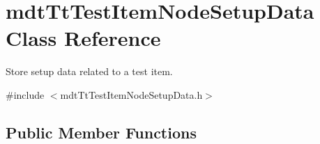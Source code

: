 \hypertarget{classmdt_tt_test_item_node_setup_data}{\section{mdt\-Tt\-Test\-Item\-Node\-Setup\-Data Class Reference}
\label{classmdt_tt_test_item_node_setup_data}
}


Store setup data related to a test item.  




{\ttfamily \#include $<$mdt\-Tt\-Test\-Item\-Node\-Setup\-Data.\-h$>$}

\subsection*{Public Member Functions}
